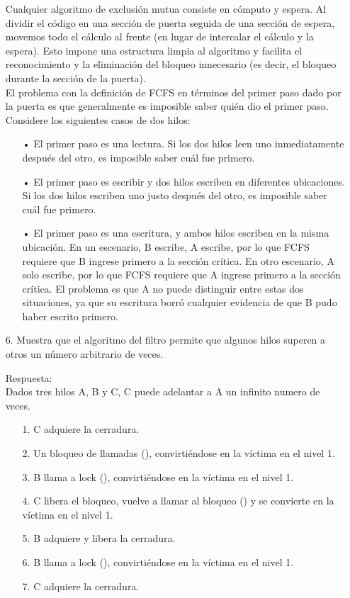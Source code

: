 \documentclass[12pt, letterpaper]{article}
\begin{document}
\begin{itemize}
Cualquier algoritmo de exclusi\'on mutua consiste en c\'omputo y espera. Al dividir el c\'odigo en una secci\'on de puerta seguida de una sección de espera, movemos todo el c\'alculo al frente (en lugar de intercalar el c\'alculo y la espera). Esto impone una estructura limpia al algoritmo y facilita el reconocimiento y la eliminaci\'on del bloqueo innecesario (es decir, el bloqueo durante la secci\'on de la puerta). \\

El problema con la definición de FCFS en términos del primer paso dado por la puerta es que generalmente es imposible saber quién dio el primer paso. Considere los siguientes casos de dos hilos: \\

\begin{itemize}

\item[• ] El primer paso es una lectura. Si los dos hilos leen uno inmediatamente despu\'es del otro, es imposible saber cu\'al fue primero.

\item[• ] El primer paso es escribir y dos hilos escriben en diferentes ubicaciones. Si los dos hilos escriben uno justo despu\'es del otro, es imposible saber cu\'al fue primero.

\item[• ] El primer paso es una escritura, y ambos hilos escriben en la misma ubicaci\'on. En un escenario, B escribe, A escribe, por lo que FCFS requiere que B ingrese primero a la sección crítica. En otro escenario, A solo escribe, por lo que FCFS requiere que A ingrese primero a la sección crítica. El problema es que A no puede distinguir entre estas dos situaciones, ya que su escritura borró cualquier evidencia de que B pudo haber escrito primero.

\end{itemize}


\item[6. ]Muestra que el algoritmo del filtro permite que algunos hilos superen a otros
un número arbitrario de veces.

Respuesta: \\
Dados tres hilos A, B y C, C puede adelantar a A un infinito numero de veces.
\begin{itemize}


\item[1. ] C adquiere la cerradura.
\item[2. ] Un bloqueo de llamadas (), convirtiéndose en la víctima en el nivel 1.
\item[3. ] B llama a lock (), convirtiéndose en la víctima en el nivel 1.
\item[4. ] C libera el bloqueo, vuelve a llamar al bloqueo () y se convierte en la víctima en el nivel 1.
\item[5. ] B adquiere y libera la cerradura.
\item[6. ] B llama a lock (), convirtiéndose en la víctima en el nivel 1.
\item[7. ] C adquiere la cerradura.


\end{itemize}
\end{itemize}
\end{document}
